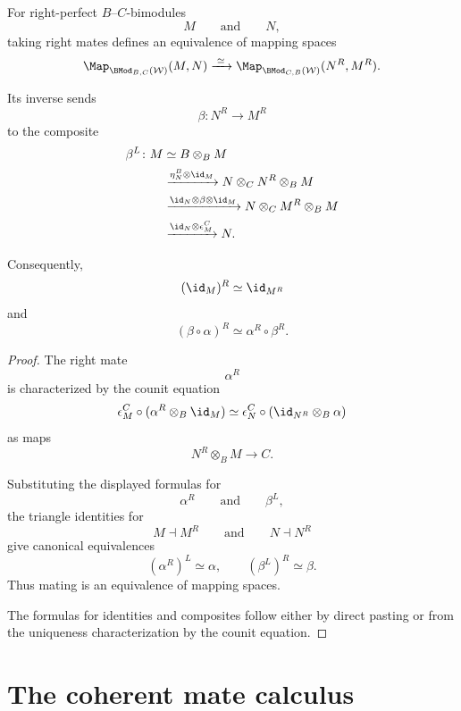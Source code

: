 \begin{proposition}
\label{prop:mate-equivalence}
For right-perfect $B$--$C$-bimodules
\[
    M
    \qquad\text{and}\qquad
    N,
\]
taking right mates defines an equivalence of mapping spaces
\[
    \Map_{\BMod_{B,C}(\mathcal W)}(M,N)
    \xrightarrow{\;\simeq\;}
    \Map_{\BMod_{C,B}(\mathcal W)}(N^R,M^R).
\]

Its inverse sends
\[
    \beta
    \colon
    N^R
    \longrightarrow
    M^R
\]
to the composite
\[
\begin{aligned}
    \beta^L
    \colon
    M
    &\simeq
    B\otimes_B M
    \\
    &\xrightarrow{
        \eta_N^{B}\otimes\id_M
    }
    N\otimes_C N^R\otimes_B M
    \\
    &\xrightarrow{
        \id_N\otimes\beta\otimes\id_M
    }
    N\otimes_C M^R\otimes_B M
    \\
    &\xrightarrow{
        \id_N\otimes\epsilon_M^{C}
    }
    N.
\end{aligned}
\]

Consequently,
\[
    (\id_M)^R
    \simeq
    \id_{M^R}
\]
and
\[
    (\beta\circ\alpha)^R
    \simeq
    \alpha^R\circ\beta^R.
\]
\end{proposition}

\begin{proof}
The right mate
\[
    \alpha^R
\]
is characterized by the counit equation
\[
    \epsilon_M^{C}
    \circ
    (\alpha^R\otimes_B\id_M)
    \simeq
    \epsilon_N^{C}
    \circ
    (\id_{N^R}\otimes_B\alpha)
\]
as maps
\[
    N^R\otimes_B M
    \longrightarrow
    C.
\]

Substituting the displayed formulas for
\[
    \alpha^R
    \qquad\text{and}\qquad
    \beta^L,
\]
the triangle identities for
\[
    M\dashv M^R
    \qquad\text{and}\qquad
    N\dashv N^R
\]
give canonical equivalences
\[
    (\alpha^R)^L
    \simeq
    \alpha,
    \qquad
    (\beta^L)^R
    \simeq
    \beta.
\]
Thus mating is an equivalence of mapping spaces.

The formulas for identities and composites follow either by direct
pasting or from the uniqueness characterization by the counit equation.
\end{proof}

\section{The coherent mate calculus}
\label{sec:coherent-mate-calculus}

